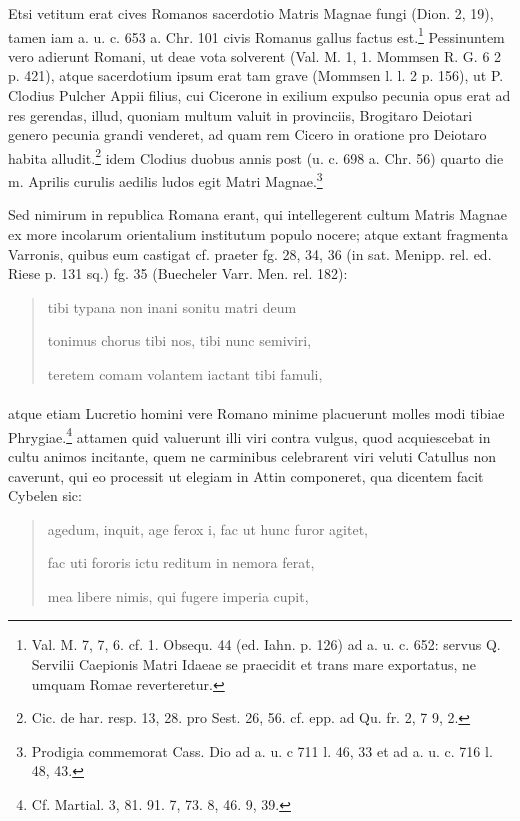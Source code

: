 \documentclass[a4paper, 11pt, oneside, polutonikogreek, german]{article}
\begin{document}
Etsi vetitum erat cives Romanos sacerdotio Matris Magnae fungi (Dion. 2, 19), tamen iam a. u. c. 653 a. Chr. 101 civis Romanus gallus factus est.\footnote{Val. M. 7, 7, 6. cf. 1. Obsequ. 44 (ed. Iahn. p. 126) ad a. u. c. 652: servus Q. Servilii Caepionis Matri Idaeae se praecidit et trans mare exportatus, ne umquam Romae reverteretur.} Pessinuntem vero adierunt Romani, ut deae vota solverent (Val. M. 1, 1. Mommsen R. G. 6 2 p. 421), atque sacerdotium ipsum erat tam grave (Mommsen l. l. 2 p. 156), ut P. Clodius Pulcher Appii filius, cui Cicerone in exilium expulso pecunia opus erat ad res gerendas, illud, quoniam multum valuit in provinciis, Brogitaro Deiotari genero pecunia grandi venderet, ad quam rem Cicero in oratione pro Deiotaro habita alludit.\footnote{Cic. de har. resp. 13, 28. pro Sest. 26, 56. cf. epp. ad Qu. fr. 2, 7 9, 2.} idem Clodius duobus annis post (u. c. 698 a. Chr. 56) quarto die m. Aprilis curulis aedilis ludos egit Matri Magnae.\footnote{Prodigia commemorat Cass. Dio ad a. u. c 711 l. 46, 33 et ad a. u. c. 716 l. 48, 43.}

Sed nimirum in republica Romana erant, qui intellegerent cultum Matris Magnae ex more incolarum orientalium institutum populo nocere; atque extant fragmenta Varronis, quibus eum castigat cf. praeter fg. 28, 34, 36 (in sat. Menipp. rel. ed. Riese p. 131 sq.) fg. 35 (Buecheler Varr. Men. rel. 182):
\begin{quotation}
tibi typana non inani sonitu matri deum

tonimus chorus tibi nos, tibi nunc semiviri,

teretem comam volantem iactant tibi famuli,
\end{quotation}
\paragraph{}
atque etiam Lucretio homini vere Romano minime placuerunt molles modi tibiae Phrygiae.\footnote{Cf. Martial. 3, 81. 91. 7, 73. 8, 46. 9, 39.} attamen quid valuerunt illi viri contra vulgus, quod acquiescebat in cultu animos incitante, quem ne carminibus celebrarent viri veluti Catullus non caverunt, qui eo processit ut elegiam in Attin componeret, qua dicentem facit Cybelen sic:
\begin{quotation}
agedum, inquit, age ferox i, fac ut hunc furor agitet,

fac uti fororis ictu reditum in nemora ferat,

mea libere nimis, qui fugere imperia cupit,
\end{quotation}
\end{document}

